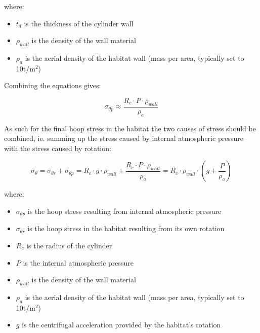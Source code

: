 \documentclass[a4paper]{article}
\begin{document}
	where:
	
	\begin{itemize}
		\item $t_d$ is the thickness of the cylinder wall
		
		\item $\rho_{wall}$ is the density of the wall material
		
		\item $\rho_a$ is the aerial density of the habitat wall (mass per area, typically set to 10t/m$^2$)
	\end{itemize}
	
	Combining the equations gives:
	
	$$ \sigma_{\theta p} \approx \frac{R_c \cdot P \cdot \rho_{wall}}{\rho_a} $$
	
	As such for the final hoop stress in the habitat the two causes of stress should be combined, ie. summing up the stress caused by internal atmospheric pressure with the stress caused by rotation:
	
	$$ \sigma_\theta = \sigma_{\theta r} + \sigma_{\theta p} = R_c \cdot g \cdot \rho_{wall} + \frac{R_c \cdot P \cdot \rho_{wall}}{\rho_a} = R_c \cdot \rho_{wall} \cdot (g + \frac{P}{\rho_a})$$
	
	where:
	
	\begin{itemize}
		\item $\sigma_{\theta p}$ is the hoop stress resulting from internal atmospheric pressure
		
		\item $\sigma_{\theta r}$ is the hoop stress in the habitat resulting from its own rotation
		
		\item $R_c$ is the radius of the cylinder
		
		\item $P$ is the internal atmospheric pressure
		
		\item $\rho_{wall}$ is the density of the wall material
		
		\item $\rho_a$ is the aerial density of the habitat wall (mass per area, typically set to 10t/m$^2$)
		
		\item $g$ is the centrifugal acceleration provided by the habitat's rotation
	\end{itemize}
	
	\pagebreak
	
\end{document}
